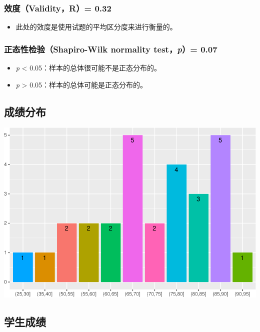 \documentclass[hyperref,adobefonts]{ctexart}
\providecommand{\tightlist}{\setlength{\itemsep}{0pt}\setlength{\parskip}{0pt}}
\begin{document}
\subsubsection{效度（Validity，R）= 0.32}\label{validityr-0.32}

\begin{itemize}
\tightlist
\item
  此处的效度是使用试题的平均区分度来进行衡量的。
\end{itemize}

\subsubsection{\texorpdfstring{正态性检验（Shapiro-Wilk normality
test，\emph{p}）=
0.07}{正态性检验（Shapiro-Wilk normality test，p）= 0.07}}\label{shapiro-wilk-normality-testp-0.07}

\begin{itemize}
\tightlist
\item
  \emph{p} \textless{} 0.05：样本的总体很可能不是正态分布的。
\item
  \emph{p} \textgreater{} 0.05：样本的总体可能是正态分布的。
\end{itemize}

\subsection{成绩分布}

\includegraphics{ita_files/figure-latex/unnamed-chunk-9-1.pdf}

\subsection{学生成绩}
\end{document}
